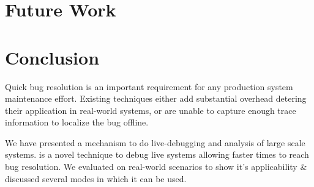 \section{Future Work}
\label{sec:futurework}

\section{Conclusion}
\label{sec:conclusion}
\noindent
Quick bug resolution is an important requirement for any production system maintenance effort.
Existing techniques either add substantial overhead detering their application in real-world systems, or are unable to capture enough trace information to localize the bug offline. 

We have presented \parikshan a mechanism to do live-debugging and analysis of large scale systems.
\parikshan is a novel technique to debug live systems allowing faster times to reach bug resolution.
We evaluated \parikshan on real-world scenarios to show it's applicability \& discussed several modes in which it can be used.
